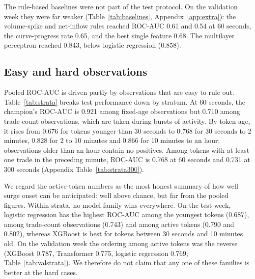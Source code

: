 The rule-based baselines were not part of the test protocol. On the validation week they were far weaker (Table~\ref{tab:baselines}, Appendix~\ref{app:extra}): the volume-spike and net-inflow rules reached ROC-AUC 0.61 and 0.54 at 60 seconds, the curve-progress rate 0.65, and the best single feature 0.68. The multilayer perceptron reached 0.843, below logistic regression (0.858).

\subsection{Easy and hard observations}

Pooled ROC-AUC is driven partly by observations that are easy to rule out. Table~\ref{tab:strata} breaks test performance down by stratum. At 60 seconds, the champion's ROC-AUC is 0.921 among fixed-age observations but 0.710 among trade-count observations, which are taken during bursts of activity. By token age, it rises from 0.676 for tokens younger than 30 seconds to 0.768 for 30 seconds to 2 minutes, 0.828 for 2 to 10 minutes and 0.866 for 10 minutes to an hour; observations older than an hour contain no positives. Among tokens with at least one trade in the preceding minute, ROC-AUC is 0.768 at 60 seconds and 0.731 at 300 seconds (Appendix Table~\ref{tab:strata300}).

We regard the active-token numbers as the most honest summary of how well surge onset can be anticipated: well above chance, but far from the pooled figures. Within strata, no model family wins everywhere. On the test week, logistic regression has the highest ROC-AUC among the youngest tokens (0.687), among trade-count observations (0.743) and among active tokens (0.790 and 0.802), whereas XGBoost is best for tokens between 30 seconds and 10 minutes old. On the validation week the ordering among active tokens was the reverse (XGBoost 0.787, Transformer 0.775, logistic regression 0.769; Table~\ref{tab:valstrata}). We therefore do not claim that any one of these families is better at the hard cases.

\begin{table}[t]
\centering
\caption{Test-week ROC-AUC by stratum, 60-second horizon. Bold marks the best model in each row. Observations older than one hour contain no positives and are omitted. Activity strata are approximated from the 30\,s and 120\,s feature windows.}
\label{tab:strata}
\tabsize
\setlength{\tabcolsep}{4pt}

\end{table}

